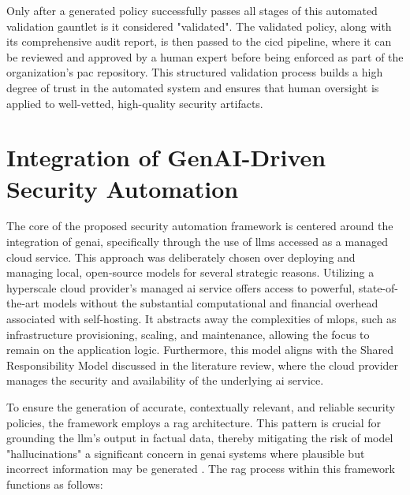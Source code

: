 Only after a generated policy successfully passes all stages of this automated validation gauntlet is it considered "validated". The validated policy, along with its comprehensive audit report, is then passed to the \gls{cicd} pipeline, where it can be reviewed and approved by a human expert before being enforced as part of the organization's \gls{pac} repository. This structured validation process builds a high degree of trust in the automated system and ensures that human oversight is applied to well-vetted, high-quality security artifacts.



\section{Integration of GenAI-Driven Security Automation} %
\label{sub:Integration of GenAI-Driven Security Automation}

The core of the proposed security automation framework is centered around the integration of \gls{genai}, specifically through the use of \glspl{llm} accessed as a managed cloud service. This approach was deliberately chosen over deploying and managing local, open-source models for several strategic reasons. Utilizing a hyperscale cloud provider's managed \gls{ai} service offers access to powerful, state-of-the-art models without the substantial computational and financial overhead associated with self-hosting. It abstracts away the complexities of \gls{mlops}, such as infrastructure provisioning, scaling, and maintenance, allowing the focus to remain on the application logic. Furthermore, this model aligns with the Shared Responsibility Model discussed in the literature review, where the cloud provider manages the security and availability of the underlying \gls{ai} service.

To ensure the generation of accurate, contextually relevant, and reliable security policies, the framework employs a \gls{rag} architecture. This pattern is crucial for grounding the \gls{llm}'s output in factual data, thereby mitigating the risk of model "hallucinations" a significant concern in \gls{genai} systems where plausible but incorrect information may be generated \cite{noauthor_ground_nodate}. The \gls{rag} process within this framework functions as follows:

